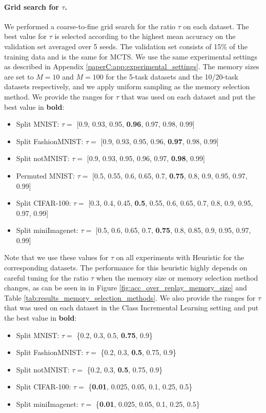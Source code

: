 \paragraph{Grid search for $\tau$.} We performed a coarse-to-fine grid search for the ratio $\tau$ on each dataset. The best value for $\tau$ is selected according to the highest mean accuracy on the validation set averaged over 5 seeds. The validation set consists of 15\% of the training data and is the same for MCTS. We use the same experimental settings as described in Appendix \ref{paperC:app:experimental_settings}. The memory sizes are set to $M=10$ and $M=100$ for the 5-task datasets and the 10/20-task datasets respectively, and we apply uniform sampling as the memory selection method. We provide the ranges for $\tau$ that was used on each dataset and put the best value in \textbf{bold}:
\begin{itemize}[topsep=1pt,noitemsep]
	\item Split MNIST: $\tau =$ [0.9, 0.93, 0.95, \textbf{0.96}, 0.97, 0.98, 0.99]
	\item Split FashionMNIST: $\tau =$ [0.9, 0.93, 0.95, 0.96, \textbf{0.97}, 0.98, 0.99]
	\item Split notMNIST: $\tau =$ [0.9, 0.93, 0.95, 0.96, 0.97, \textbf{0.98}, 0.99]
	\item Permuted MNIST: $\tau =$ [0.5, 0.55, 0.6, 0.65, 0.7, \textbf{0.75}, 0.8, 0.9, 0.95, 0.97, 0.99]
	\item Split CIFAR-100: $\tau =$ [0.3, 0.4, 0.45, \textbf{0.5}, 0.55, 0.6, 0.65, 0.7, 0.8, 0.9, 0.95, 0.97, 0.99]
	\item  Split miniImagenet: $\tau =$ [0.5, 0.6, 0.65, 0.7, \textbf{0.75}, 0.8, 0.85, 0.9, 0.95, 0.97, 0.99]
\end{itemize}
Note that we use these values for $\tau$ on all experiments with Heuristic for the corresponding datasets. The performance for this heuristic highly depends on careful tuning for the ratio $\tau$ when the memory size or memory selection method changes, as can be seen in in Figure \ref{fig:acc_over_replay_memory_size} and Table \ref{tab:results_memory_selection_methods}. We also provide the ranges for $\tau$ that was used on each dataset in the Class Incremental Learning setting and put the best value in \textbf{bold}:
\begin{itemize}[topsep=1pt,noitemsep]
	\item Split MNIST: $\tau =$ \{0.2, 0.3, 0.5, \textbf{0.75}, 0.9\}
	\item Split FashionMNIST: $\tau =$ \{0.2, 0.3, \textbf{0.5},  0.75, 0.9\}
	\item Split notMNIST:  $\tau =$ \{0.2, 0.3, \textbf{0.5},  0.75, 0.9\}
	\item Split CIFAR-100: $\tau =$ \{\textbf{0.01}, 0.025, 0.05, 0.1, 0.25, 0.5\}
	\item  Split miniImagenet: $\tau =$ \{\textbf{0.01}, 0.025, 0.05, 0.1, 0.25, 0.5\}
\end{itemize}




